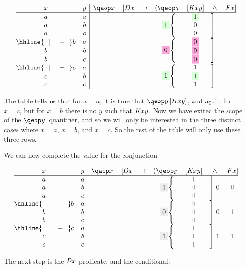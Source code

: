 \documentclass[PHIL101-Textbook.tex]{subfiles}
\begin{document}
  \[
	\begin{array}{@{}cc|ccccccc@{}}
	x & y & \qa x & [\atom D x & \eif & (\qe y & [\atom K {xy}] & \eand & \atom F x]\\ \hline
	a & a &&&&\brax{3}{\TT}&\TT&\braz{3}{\ }&\\
	a & b &&&&&\vF&&\\
	a & c &&&&&\vF&&\\
                 \hhline{~~|~~~~-~~}
	b & a &&&&\brax{3}{\FF}&\FF&\braz{3}{\ }&\\
	b & b &&&&&\FF&&\\
	b & c &&&&&\FF&&\\
                 \hhline{~~|~~~~-~~}
	c & a &&&&\brax{3}{\TT}&\vT&\braz{3}{\ }&\\
	c & b &&&&&\TT&&\\
	c & c &&&&&\vT&&\\
	\end{array}
  \]

  \noindent The table tells us that for $x=a$, it is true that $\qeb{y}{\atom K {xy}}$, and again for $x=c$, but for $x=b$ there is no $y$ such that $\mathord{K}{xy}$. Now we have exited the scope of the $\qe y$ quantifier, and so we will only be interested in the three distinct cases where $x=a$, $x=b$, and $x=c$. So the rest of the table will only use these three rows.
  


  \noindent We can now complete the value for the conjunction:

  \[
	\begin{array}{@{}cc|ccccccc@{}}
	x & y & \qa x & [\atom D x & \eif & (\qe y & [\atom K {xy}] & \eand & \atom F x]\\ \hline
 a & a &&&&\brax{3}{\GT}&\gT&\braz{3}{\ \vF}&\\
	  a & b &&&&&\gF&&\gF\\
	  a & c &&&&&\gF&&\\\hhline{~~|~~~~-~~}
	  b & a &&&&\brax{3}{\GF}&\gF&\braz{3}{\ \vF}&\\
	  b & b &&&&&\gF&&\gT\\
	  b & c &&&&&\gF&&\\\hhline{~~|~~~~-~~}
	  c & a &&&&\brax{3}{\GT}&\gT&\braz{3}{\ \vT}&\\
	  c & b &&&&&\gT&&\gT\\
	  c & c &&&&&\gT&&\\
	\end{array}
  \]  
  

  \noindent The next step is the $\mathord{D}{x}$ predicate, and the conditional:
\end{document}
